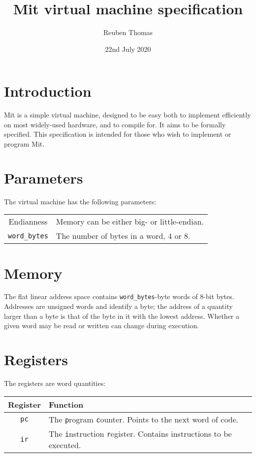 \documentclass[a4paper]{article}
\title{Mit virtual machine specification}
\author{Reuben Thomas}
\date{22nd July 2020}
\begin{document}
\maketitle

\section{Introduction}

Mit is a simple virtual machine, designed to be easy both to implement efficiently on most widely-used hardware, and to compile for. It aims to be formally specified. This specification is intended for those who wish to implement or program Mit.


\section{Parameters}

The virtual machine has the following parameters:

\begin{center}
\begin{tabular}{cp{3.25in}} \toprule
Endianness & Memory can be either big- or little-endian. \\
{\tt word\_bytes} & The number of bytes in a word, $4$ or $8$. \\
 \bottomrule
\end{tabular}
\end{center}


\section{Memory}

The flat linear address space contains {\tt word\_bytes}-byte words of $8$-bit bytes. Addresses are unsigned words and identify a byte; the address of a quantity larger than a byte is that of the byte in it with the lowest address. Whether a given word may be read or written can change during execution.


\section{Registers}
\label{registers}

The registers are word quantities:

\begin{center}
\begin{tabular}{cp{3.75in}} \toprule
\bf Register & \bf Function \\
 \midrule
{\tt pc} & The {\tt p}rogram {\tt c}ounter. Points to the next word of code. \\
{\tt ir} & The {\tt i}nstruction {\tt r}egister. Contains instructions to be executed. \\
 \bottomrule
\end{tabular}
\end{center}
\end{document}
